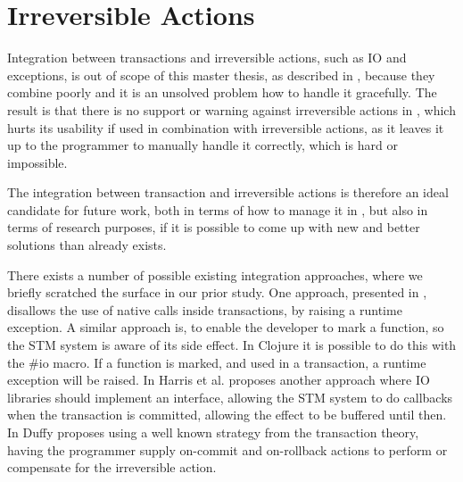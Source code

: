 \section{Irreversible Actions}
Integration between transactions and irreversible actions, such as \ac{IO} and exceptions, is out of scope of this master thesis, as described in , because they combine poorly and it is an unsolved problem how to handle it gracefully\cite{harris2005exceptions}. The result is that there is no support or warning against irreversible actions in \stmname, which hurts its usability if used in combination with irreversible actions, as it leaves it up to the programmer to manually handle it correctly, which is hard or impossible.

The integration between transaction and irreversible actions is therefore an ideal candidate for future work, both in terms of how to manage it in \stmname, but also in terms of research purposes, if it is possible to come up with new and better solutions than already exists. 

There exists a number of possible existing integration approaches, where we briefly scratched the surface in our prior study\cite[p. 51-52]{dpt907e14trending}. One approach, presented in \cite[p. 4]{harris2003language}, disallows the use of native calls inside transactions, by raising a runtime exception. A similar approach is, to enable the developer to mark a function, so the \ac{STM} system is aware of its side effect. In Clojure it is possible to do this with the \#io macro. If a function is marked, and used in a transaction, a runtime exception will be raised. In \cite{harris2005exceptions} Harris et al. proposes another approach where \ac{IO} libraries should implement an interface, allowing the \ac{STM} system to do callbacks when the transaction is committed, allowing the effect to be buffered until then. In \cite{duffy2010stmnet} Duffy proposes using a well known strategy from the transaction theory\cite{reuter1993transaction}, having the programmer supply on-commit and on-rollback actions to perform or compensate for the irreversible action.

\worksheetend
